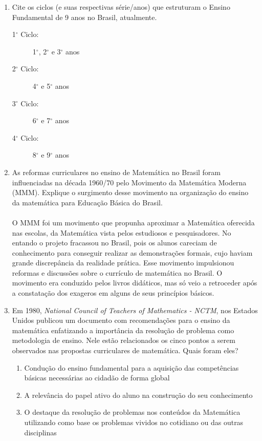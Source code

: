 \documentclass[a4paper, 12pt]{article}
\begin{document}
\begin{enumerate}
\begin{itemize}
  \end{itemize}
\item Cite os ciclos (e suas respectivas série/anos) que estruturam o Ensino Fundamental de 9 anos no Brasil, atualmente.
  \begin{description}
  \item[1$^{\circ}$ Ciclo:] 1$^{\circ}$, 2$^{\circ}$ e 3$^{\circ}$ anos
  \item[2$^{\circ}$ Ciclo:] 4$^{\circ}$ e 5$^{\circ}$ anos
  \item[3$^{\circ}$ Ciclo:] 6$^{\circ}$ e 7$^{\circ}$ anos
  \item[4$^{\circ}$ Ciclo:] 8$^{\circ}$ e 9$^{\circ}$ anos
  \end{description}
\item As reformas curriculares no ensino de Matemática no Brasil foram influenciadas na década 1960/70 pelo Movimento da Matemática Moderna (MMM). Explique o surgimento desse movimento na organização do ensino da matemática para Educação Básica do Brasil. \\ \\
 O MMM foi um movimento que propunha aproximar a Matemática oferecida nas escolas, da Matemática vista pelos estudiosos e pesquisadores. No entando o projeto fracassou no Brasil, pois os alunos careciam de conhecimento para conseguir realizar as demonstrações formais, cujo haviam grande discrepância da realidade prática. Esse movimento impulsionou reformas e discussões sobre o currículo de matemática no Brasil. O movimento era conduzido pelos livros didáticos, mas só veio a retroceder após a constatação dos exageros em alguns de seus princípios básicos.
\item Em 1980, \textit{National Council of Teachers of Mathematics - NCTM}, nos Estados Unidos publicou um documento com recomendações para o ensino da matemática enfatizando a importância da resolução de problema como metodologia de ensino. Nele estão relacionados os cinco pontos a serem observados nas propostas curriculares de matemática. Quais foram eles?
  \begin{enumerate}
  \item Condução do ensino fundamental para a aquisição das competências básicas necessárias ao cidadão de forma global
  \item A relevância do papel ativo do aluno na construção do seu conhecimento
  \item O destaque da resolução de problemas nos conteúdos da Matemática utilizando como base os problemas vividos no cotidiano ou das outras disciplinas

\end{enumerate}
\end{enumerate}
\end{document}
